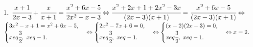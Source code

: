 1. $\cfrac{x+1}{2x-3}+\cfrac{x}{x+1}=\cfrac{x^2+6x-5}{2x^2-x-3}\Leftrightarrow \cfrac{x^2+2x+1+2x^2-3x}{(2x-3)(x+1)}=\cfrac{x^2+6x-5}{(2x-3)(x+1)}\Leftrightarrow$\\$
\begin{cases} 3x^2-x+1=x^2+6x-5,\\ x
eq\cfrac{3}{2},\ x
eq-1.\end{cases}\Leftrightarrow
\begin{cases} 2x^2-7x+6=0,\\ x
eq\cfrac{3}{2},\ x
eq-1.\end{cases}\Leftrightarrow
\begin{cases} (x-2)(2x-3)=0,\\ x
eq\cfrac{3}{2},\ x
eq-1.\end{cases}\Leftrightarrow x=2.$\\
